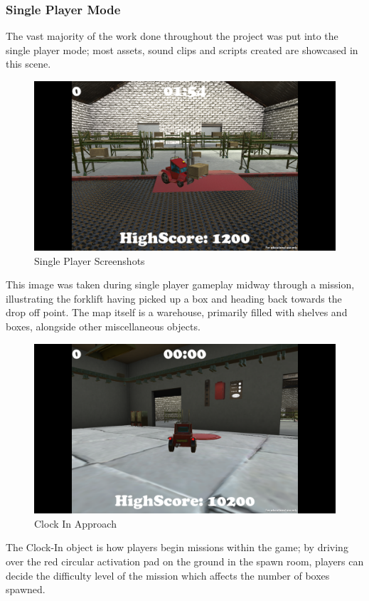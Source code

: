 \documentclass[12pt]{article}
\begin{document}
\subsubsection{Single Player Mode}
The vast majority of the work done throughout the project was put into the single player mode; most assets, sound clips and scripts created are showcased in this scene.
\begin{figure}[H]
	\caption{Single Player Screenshots}
	\includegraphics[width=\textwidth]{images/sp}
\end{figure}
This image was taken during single player gameplay midway through a mission, illustrating the forklift having picked up a box and heading back towards the drop off point. The map itself is a warehouse, primarily filled with shelves and boxes, alongside other miscellaneous objects.

\begin{figure}[H]
	\caption{Clock In Approach}
	\includegraphics[width=\textwidth]{images/clockInApproach}
\end{figure}
The Clock-In object is how players begin missions within the game; by driving over the red circular activation pad on the ground in the spawn room, players can decide the difficulty level of the mission which affects the number of boxes spawned. 
\end{document}
